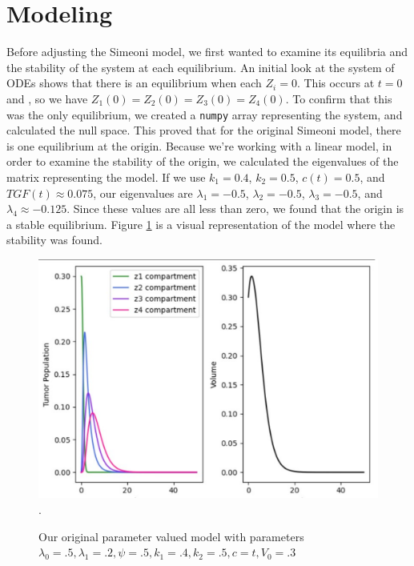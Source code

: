 \documentclass[11pt]{amsart}
\begin{document}
\section{Modeling}
Before adjusting the Simeoni model, we first wanted to examine its equilibria and the stability of the system at each equilibrium. An initial look at the system of ODEs shows that there is an equilibrium when each $Z_i = 0$. This occurs at $t=0$ and , so we have $Z_1(0) = Z_2(0) = Z_3(0) = Z_4(0)$. To confirm that this was the only equilibrium, we created a \verb!numpy! array representing the system, and calculated the null space. This proved that for the original Simeoni model, there is one equilibrium at the origin. Because we're working with a linear model, in order to examine the stability of the origin, we calculated the eigenvalues of the matrix representing the model. If we use $k_1 = 0.4$, $k_2 = 0.5$, $c(t) = 0.5$, and $TGF(t) \approx 0.075$, our eigenvalues are $\lambda_1 = -0.5$, $\lambda_2 = -0.5$, $\lambda_3 = -0.5$, and $\lambda_4 \approx -0.125$. Since these values are all less than zero, we found that the origin is a stable equilibrium. Figure \ref{fig:1} is a visual representation of the model where the stability was found.
\begin{figure}[h]

\begin{center} %
\includegraphics[width=\textwidth]{original_tumor_random_parameters.pdf}. %
\end{center}
\caption{Our original parameter valued model with parameters $\lambda_0=.5, \lambda_1=.2, \psi=.5, k_1 = .4, k_2=.5, c=t, V_0 = .3$}
\label{fig:1}
\end{figure}
\end{document}
